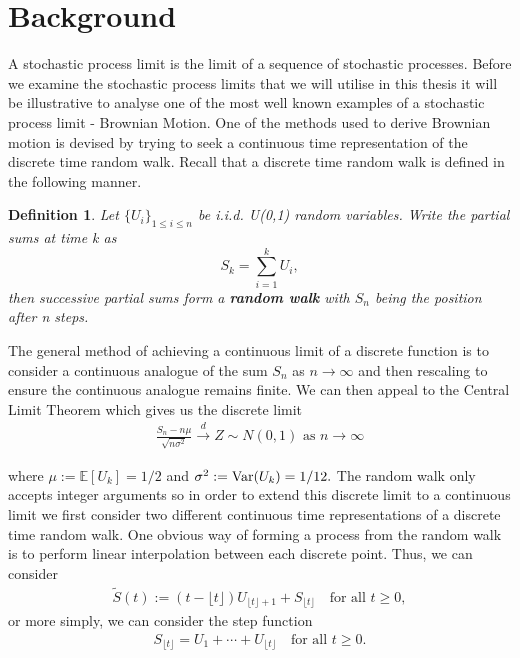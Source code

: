 \documentclass[honours,12pt]{UNSWthesis}
\newcommand{\E}{\mathbb{E}}
\newcommand{\1}{\mathbf 1}
\newcommand{\Var}{\mathop{\rm Var}}
\newtheorem{definition}[theorem]{Definition}
\numberwithin{equation}{section}
\theoremstyle{definition}
\theoremstyle{remark}
\begin{document}
\section{Background}\label{s:background}
A stochastic process limit is the limit of a sequence of stochastic processes. Before we examine the stochastic process limits that we will utilise in this thesis it will be illustrative to analyse one of the most well known examples of a stochastic process limit - Brownian Motion. One of the methods used to derive Brownian motion is devised by trying to seek a continuous time representation of the discrete time random walk. Recall that a discrete time random walk is defined in the following manner.\\
\begin{definition}
Let $\{U_i\}_{1\leq i \leq n}$ be i.i.d. U(0,1) random variables. Write the partial sums at time k as
\[
	S_k=\sum_{i=1}^k U_i,
\]
then successive partial sums form a \textbf{random walk} with $S_n$ being the position after n steps.
\\
\end{definition}
\noindent The general method of achieving a continuous limit of a discrete function is to consider a continuous analogue of the sum $S_n$ as $n\to\infty$ and then rescaling to ensure the continuous analogue remains finite. We can then appeal to the Central Limit Theorem which gives us the discrete limit
\begin{align}\label{eq:clt}
\frac{S_n-n\mu}{\sqrt{n\sigma^2}}\overset{d}{\longrightarrow}Z\sim N(0,1)\textrm{ as $n\to\infty$}
\end{align}

\noindent where $\mu:=\E[U_k]=1/2$ and $\sigma^2:=\Var(U_k)=1/12.$
The random walk only accepts integer arguments so in order to extend this discrete limit to a continuous limit we first consider two different continuous time representations of a discrete time random walk. One obvious way of forming a process from the random walk is to perform linear interpolation between each discrete point. Thus, we can consider
\begin{align}
	\tilde{S}(t):=(t-\lfloor t \rfloor)U_{\lfloor t \rfloor +1} + S_{\lfloor t \rfloor}\quad\textrm{for all } t\geq0,
\end{align}
or more simply, we can consider the step function
\begin{align}\label{fun:step}
	S_{\lfloor t \rfloor}=U_1+\cdots+U_{\lfloor t \rfloor}  \quad\textrm{for all } t\geq0.
\end{align}
\end{document}
